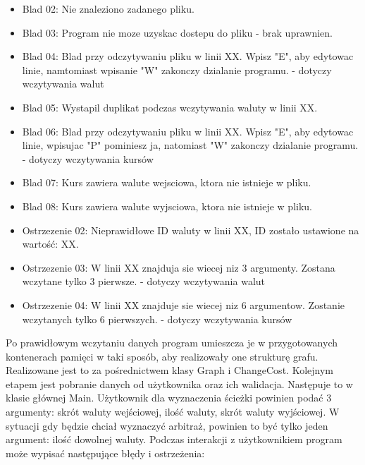 \documentclass[12pt]{article}
\begin{document}
\begin{itemize}
\item Blad 02: Nie znaleziono zadanego pliku.
\item Blad 03: Program nie moze uzyskac dostepu do pliku - brak uprawnien.
\item Blad 04: Blad przy odczytywaniu pliku w linii XX. Wpisz "E", aby edytowac linie, namtomiast wpisanie "W" zakonczy dzialanie programu. - dotyczy wczytywania walut
\item Blad 05: Wystapil duplikat podczas wczytywania waluty w linii XX.
\item Blad 06: Blad przy odczytywaniu pliku w linii XX. Wpisz "E", aby edytowac linie, wpisujac "P" pominiesz ja, natomiast "W" zakonczy dzialanie programu. - dotyczy wczytywania kursów
\item Blad 07: Kurs zawiera walute wejsciowa, ktora nie istnieje w pliku.
\item Blad 08: Kurs zawiera walute wyjsciowa, ktora nie istnieje w pliku.
\end{itemize}
\begin{itemize}
\item Ostrzezenie 02: Nieprawidłowe ID waluty w linii XX, ID zostało ustawione na wartość: XX.
\item Ostrzezenie 03: W linii XX znajduja sie wiecej niz 3 argumenty. Zostana wczytane tylko 3 pierwsze. - dotyczy wczytywania walut
\item Ostrzezenie 04: W linii XX znajduje sie wiecej niz 6 argumentow. Zostanie wczytanych tylko 6 pierwszych. - dotyczy wczytywania kursów
\end{itemize}

Po prawidłowym wczytaniu danych program umieszcza je w przygotowanych kontenerach pamięci w taki sposób, aby realizowały one strukturę grafu. Realizowane jest to za pośrednictwem klasy Graph i ChangeCost.
\newline\newline
Kolejnym etapem jest pobranie danych od użytkownika oraz ich walidacja. Następuje to w klasie głównej Main. Użytkownik dla wyznaczenia ścieżki powinien podać 3 argumenty: skrót waluty wejściowej, ilość waluty, skrót waluty wyjściowej. W sytuacji gdy będzie chciał wyznaczyć arbitraż, powinien to być tylko jeden argument: ilość dowolnej waluty. Podczas interakcji z użytkownikiem program może wypisać następujące błędy i ostrzeżenia:
\end{document}
